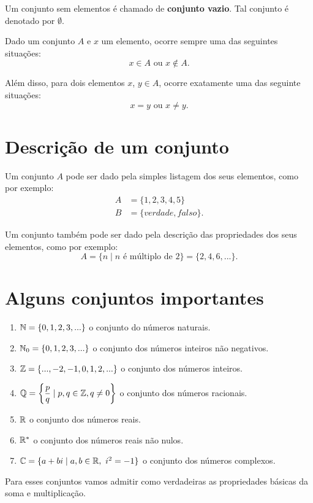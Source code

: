 Um conjunto sem elementos {\'e} chamado de \textbf{conjunto vazio}. Tal conjunto {\'e} denotado por $\emptyset$.

Dado um conjunto $A$ e $x$ um elemento, ocorre sempre uma das seguintes situa\c{c}\~oes:
\[
x \in A \mbox{ ou } x \notin A.
\]

Al{\'e}m disso, para dois elementos $x$, $y \in A$, ocorre exatamente uma das seguinte situa\c{c}\~oes:
\[
x = y \mbox{ ou } x \neq y.
\]

\section{Descri{\c c}{\~a}o de um conjunto}

Um conjunto $A$ pode ser dado pela simples listagem dos seus elementos, como por exemplo:
\begin{align*}
	A &= \{1,2,3,4,5\}\\
	B &= \{verdade, falso\}.
\end{align*}

Um conjunto tamb{\'e}m pode ser dado pela descri{\c c}{\~a}o das propriedades dos seus elementos, como por exemplo:
\[
A = \{n \mid n \mbox{ \'e m{\'u}ltiplo de } 2\} = \{2,4,6,...\}.
\]

\section{Alguns conjuntos importantes}
\begin{enumerate}[label={\arabic*})]
	\item $\mathbb{N} = \{0,1,2,3,...\}$ o conjunto do n{\'u}meros naturais.
	\item $\mathbb{N}_0 = \{0,1,2,3,...\}$ o conjunto dos n{\'u}meros inteiros n{\~a}o negativos.
	\item $\mathbb{Z} = \{...,-2,-1,0,1,2,...\}$ o conjunto dos n{\'u}meros inteiros.
	\item $\mathbb{Q} = \left\{\dfrac{p}{q} \mid p,q \in \mathbb{Z}, q \neq 0 \right\}$ o conjunto dos n{\'u}meros racionais.
	\item $\mathbb{R} $ o conjunto dos n{\'u}meros reais.
	\item $\mathbb{R}^*$ o conjunto dos n{\'u}meros reais n{\~a}o nulos.
	\item $\mathbb{C} = \{a + bi \mid a,b \in \mathbb{R},\ i^2 = -1\}$ o conjunto dos n\'umeros complexos.
\end{enumerate}

\begin{observacao}
	Para esses conjuntos vamos admitir como verdadeiras as propriedades b\'asicas da soma e multiplica\c{c}\~ao.
\end{observacao}

